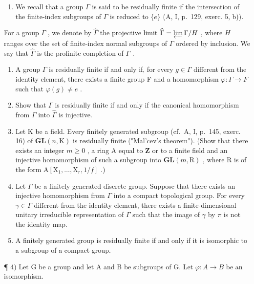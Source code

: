 \begin{enumerate}
\def\labelenumi{\arabic{enumi})}
\setcounter{enumi}{2}
\tightlist
\item
  We recall that a group \(\Gamma\) is said to be residually finite if the intersection of the finite-index subgroups of \(\Gamma\) is reduced to \(\{e\}\) (A, I, p.~129, exerc. 5, b)).
\end{enumerate}

For a group \(\Gamma\) , we denote by \(\widehat{\Gamma}\) the projective limit \(\widehat{\Gamma} = \varprojlim \Gamma / H\) , where \(H\) ranges over the set of finite-index normal subgroups of \(\Gamma\) ordered by inclusion. We say that \(\widehat{\Gamma}\) is the profinite completion of \(\Gamma\) .

\begin{enumerate}
\def\labelenumi{\alph{enumi})}
\item
  A group \(\Gamma\) is residually finite if and only if, for every \(g \in \Gamma\) different from the identity element, there exists a finite group F and a homomorphism \(\varphi: \Gamma \to F\) such that \(\varphi(g) \neq e\) .
\item
  Show that \(\Gamma\) is residually finite if and only if the canonical homomorphism from \(\Gamma\) into \(\widehat{\Gamma}\) is injective.
\item
  Let K be a field. Every finitely generated subgroup (cf.~A, I, p.~145, exerc. 16) of \(\mathbf{GL}(n,\mathrm{K})\) is residually finite ("Mal'cev's theorem"). (Show that there exists an integer \(m\geqslant 0\) , a ring A equal to \(\mathbf{Z}\) or to a finite field and an injective homomorphism of such a subgroup into \(\mathbf{GL}(m,\mathrm{R})\) , where R is of the form \(\mathrm{A}[\mathrm{X}_1,\dots ,\mathrm{X}_r,1 / f]\) .)
\item
  Let \(\Gamma\) be a finitely generated discrete group. Suppose that there exists an injective homomorphism from \(\Gamma\) into a compact topological group. For every \(\gamma \in \Gamma\) different from the identity element, there exists a finite-dimensional unitary irreducible representation of \(\Gamma\) such that the image of \(\gamma\) by \(\pi\) is not the identity map.
\item
  A finitely generated group is residually finite if and only if it is isomorphic to a subgroup of a compact group.
\end{enumerate}

¶ 4) Let G be a group and let A and B be subgroups of G. Let \(\varphi\colon A\to B\) be an isomorphism.

